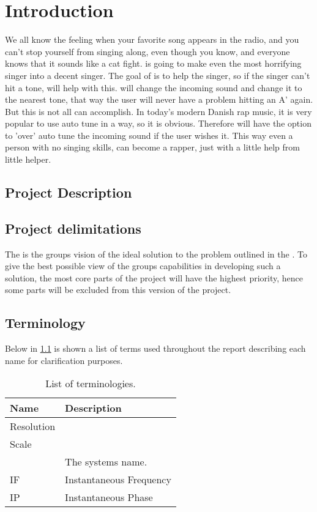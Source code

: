 
\chapter{Introduction}
\label{sec:introduction}
We all know the feeling when your favorite song appears in the radio, and you can't stop yourself from singing along, even though you know, and everyone knows that it sounds like a cat fight.
\systemName is going to make even the most horrifying singer into a decent singer.
The goal of \systemName is to help the singer, so if the singer can't hit a tone, \systemName will help with this. \systemName will change the incoming sound and change it to the nearest tone, that way the user will never have a problem hitting an A' again.
But this is not all \systemName can accomplish. In today's modern Danish rap music, it is very popular to use auto tune in a way, so it is obvious.
Therefore \systemName will have the option to 'over' auto tune the incoming sound if the user wishes it.
This way even a person with no singing skills, can become a rapper, just with a little help from little helper.

\section{Project Description}
\label{sec:projectDescription}


\section{Project delimitations}
\label{sec:delimitations}
The  is the groups vision of the ideal solution to the problem outlined in the .  
To give the best possible view of the groups capabilities in developing such a solution, the most core parts of the project will have the highest priority, hence some parts will be excluded from this version of the project. 

\section{Terminology}
\label{sec:terminology}
Below in \cref{tab:terminology} is shown a list of terms used throughout the report describing each name for clarification purposes.

\begin{table}[H]
	\centering
	\begin{tabularx}{0.8\textwidth}{l X}
		\toprule
		\textbf{Name} & \textbf{Description} \\
		\midrule
		Resolution & \\
		Scale & \\
		\systemName & The systems name. \\
		IF & Instantaneous Frequency \\
		IP & Instantaneous Phase \\
		\bottomrule
	\end{tabularx}
	\caption{List of terminologies.}
	\label{tab:terminology}
\end{table}